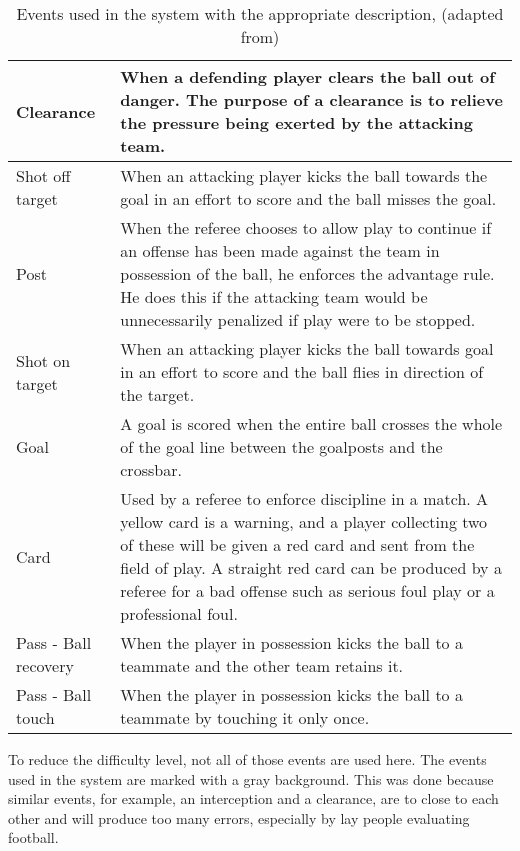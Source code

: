 \begin{table}[H]
{\begin{tabular}{p{5cm}p{14cm}}
        	\hline
	    Clearance & When a defending player clears the ball out of danger. The purpose of a clearance is to relieve the pressure being exerted by the attacking team.\\
        	\hline
        \rowcolor{gray!30}
	    Shot off target & When an attacking player kicks the ball towards the goal in an effort to score and the ball misses the goal.\\
        	\hline
	    Post & When the referee chooses to allow play to continue if an offense has been made against the team in possession of the ball, he enforces the advantage rule. He does this if the attacking team would be unnecessarily penalized if play were to be stopped.\\
        	\hline
        \rowcolor{gray!30}
        	Shot on target & When an attacking player kicks the ball towards goal in an effort to score and the ball flies in direction of the target.\\
        	\hline
        \rowcolor{gray!30}
	    Goal & A goal is scored when the entire ball crosses the whole of the goal line between the goalposts and the crossbar.\\
        	\hline
        \rowcolor{gray!30}
	    Card & Used by a referee to enforce discipline in a match. A yellow card is a warning, and a player collecting two of these will be given a red card and sent from the field of play. A straight red card can be produced by a referee for a bad offense such as serious foul play or a professional foul.\\
        	\hline
	    Pass - Ball recovery & When the player in possession kicks the ball to a teammate and the other team retains it.\\
        	\hline
	    Pass - Ball touch & When the player in possession kicks the ball to a teammate by touching it only once.\\
        	\hline
    \end{tabular}
    }
   \caption[]{Events used in the system with the appropriate description, (adapted from\footnotemark)}
    
    \label{tb:Events}
\end{table}

To reduce the difficulty level, not all of those events are used here. The events used in the system are marked with a gray background.
This was done because similar events, for example, an interception and a clearance, are to close to each other and will produce too many errors, especially by lay people evaluating football.

